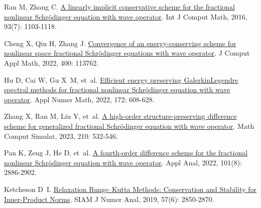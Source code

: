 \begin{thebibliography}{79}
    Ran M, Zhang C.
    \newblock \href{http://www.tandfonline.com/doi/full/10.1080/00207160.2015.1016924}{A linearly implicit conservative scheme for the fractional nonlinear {{Schr{\"o}dinger}} equation with wave operator}\allowbreak[J].
    \newblock Int J Comput Math, 2016, 93\allowbreak (7): 1103-1118.
    
    Cheng X, Qin H, Zhang J.
    \newblock \href{https://linkinghub.elsevier.com/retrieve/pii/S0377042721003848}{Convergence of an energy-conserving scheme for nonlinear space fractional {{Schr{\"o}dinger}} equations with wave operator}\allowbreak[J].
    \newblock J Comput Appl Math, 2022, 400: 113762.
    
    Hu D, Cai W, Gu X~M, et~al.
    \newblock \href{https://linkinghub.elsevier.com/retrieve/pii/S0168927421002981}{Efficient energy preserving {{Galerkin}}{\textendash}{{Legendre}} spectral methods for fractional nonlinear {{Schr{\"o}dinger}} equation with wave operator}\allowbreak[J].
    \newblock Appl Numer Math, 2022, 172: 608-628.
    
    Zhang X, Ran M, Liu Y, et~al.
    \newblock \href{https://www.sciencedirect.com/science/article/pii/S0378475423001325}{A high-order structure-preserving difference scheme for generalized fractional {{Schr{\"o}dinger}} equation with wave operator}\allowbreak[J].
    \newblock Math Comput Simulat, 2023, 210: 532-546.
    
    Pan K, Zeng J, He D, et~al.
    \newblock \href{https://doi.org/10.1080/00036811.2020.1829600}{A fourth-order difference scheme for the fractional nonlinear {{Schr{\"o}dinger}} equation with wave operator}\allowbreak[J].
    \newblock Appl Anal, 2022, 101\allowbreak (8): 2886-2902.
    
    Ketcheson D~I.
    \newblock \href{https://epubs.siam.org/doi/abs/10.1137/19M1263662}{Relaxation {{Runge--Kutta Methods}}: {{Conservation}} and {{Stability}} for {{Inner-Product Norms}}}\allowbreak[J].
    \newblock SIAM J Numer Anal, 2019, 57\allowbreak (6): 2850-2870.
    

\end{thebibliography}
